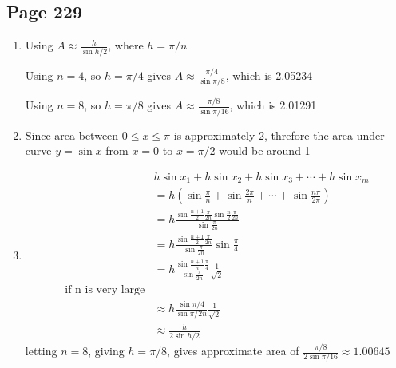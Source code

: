 \documentclass{article}
\newenvironment{solutions}[1]
{\subsection*{#1}
 \begin{enumerate}[leftmargin=1.5em]}
{\end{enumerate}}
\newcommand{\solution}{\item}
\begin{document}
\begin{solutions}{Page 229}
\solution
Using $A \approx \frac{h}{\sin h/2}$, where $h=\pi/n$

Using $n=4$, so $h=\pi/4$ gives $A \approx \frac{\pi/4}{\sin \pi/8}$, which is 2.05234

Using $n=8$, so $h=\pi/8$ gives $A \approx \frac{\pi/8}{\sin \pi/16}$, which is 2.01291
\solution
Since area between $0 \leq x \leq \pi$ is approximately 2, threfore the area under curve $y=\sin x$ from $x=0$ to $x=\pi/2$ would be around 1
\solution
\begin{align*}
    &h\sin x_1 + h\sin x_2 + h\sin x_3 +\cdots + h\sin x_m  \\
    &=h\left( \sin \frac{\pi}{n} + \sin \frac{2\pi}{n}+ \cdots + \sin \frac{n\pi}{2\pi} \right)\\
    &= h \frac{\sin \frac{n+1}{2} \frac{\pi}{2n} \sin \frac{n}{2}\frac{\pi}{2n}}{\sin \frac{\pi}{2n}}\\
    &= h \frac{\sin \frac{n+1}{2}\frac{\pi}{2n}}{\sin \frac{\pi}{2n}} \sin \frac{\pi}{4}\\
    &= h \frac{\sin \frac{n+1}{n}\frac{\pi}{4}}{\sin \frac{\pi}{2n}} \frac{1}{\sqrt{2}} \\
    \text{if n is very large}\\
    &\approx h\frac{\sin \pi/4}{\sin \pi/2n}\frac{1}{\sqrt{2}} \\
    &\approx \frac{h}{2\sin h/2}
\end{align*}
letting $n=8$, giving $h = \pi/8$, gives approximate area of $\frac{\pi/8}{2\sin \pi/16} \approx 1.00645$ 

\end{solutions}
\end{document}
